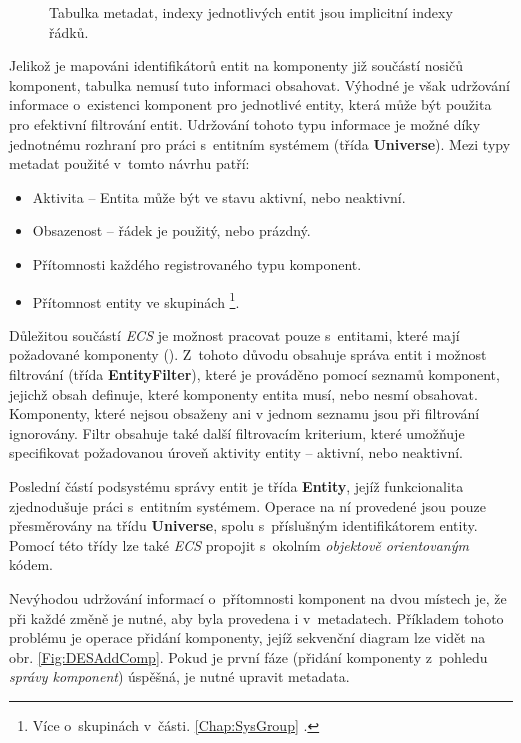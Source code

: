 \begin{figure}[H]
	\centering
	\caption{Tabulka metadat, indexy jednotlivých entit jsou implicitní indexy řádků.}
	\label{Fig:DESMetadata}
\end{figure}

Jelikož je mapováni identifikátorů entit na komponenty již součástí nosičů komponent, tabulka nemusí tuto informaci obsahovat. Výhodné je však udržování informace o~existenci komponent pro jednotlivé entity, která může být použita pro efektivní filtrování entit. Udržování tohoto typu informace je možné díky jednotnému rozhraní pro práci s~entitním systémem (třída \textbf{Universe}). Mezi typy metadat použité v~tomto návrhu patří: 
\begin{itemize}
	\item Aktivita -- Entita může být ve stavu aktivní, nebo neaktivní.
	\item Obsazenost -- řádek je použitý, nebo prázdný. 
	\item Přítomnosti každého registrovaného typu komponent.
	\item Přítomnost entity ve skupinách \footnote{Více o~skupinách v~části. \ref{Chap:SysGroup} .}.
\end{itemize}

Důležitou součástí \emph{ECS} je možnost pracovat pouze s~entitami, které mají požadované komponenty (). Z~tohoto důvodu obsahuje správa entit i možnost filtrování (třída \textbf{EntityFilter}), které je prováděno pomocí seznamů komponent, jejichž obsah definuje, které komponenty entita musí, nebo nesmí obsahovat. Komponenty, které nejsou obsaženy ani v jednom seznamu jsou při filtrování ignorovány. Filtr obsahuje také další filtrovacím kriterium, které umožňuje specifikovat požadovanou úroveň aktivity entity -- aktivní, nebo neaktivní.

Poslední částí podsystému správy entit je třída \textbf{Entity}, jejíž funkcionalita zjednodušuje práci s~entitním systémem. Operace na ní provedené jsou pouze přesměrovány na třídu \textbf{Universe}, spolu s~příslušným identifikátorem entity. Pomocí této třídy lze také \emph{ECS} propojit s~okolním \emph{objektově orientovaným} kódem.

Nevýhodou udržování informací o~přítomnosti komponent na dvou místech je, že při každé změně je nutné, aby byla provedena i v~metadatech. Příkladem tohoto problému je operace přidání komponenty, jejíž sekvenční diagram lze vidět na obr. \ref{Fig:DESAddComp}. Pokud je první fáze (přidání komponenty z~pohledu \emph{správy komponent}) úspěšná, je nutné upravit metadata.

